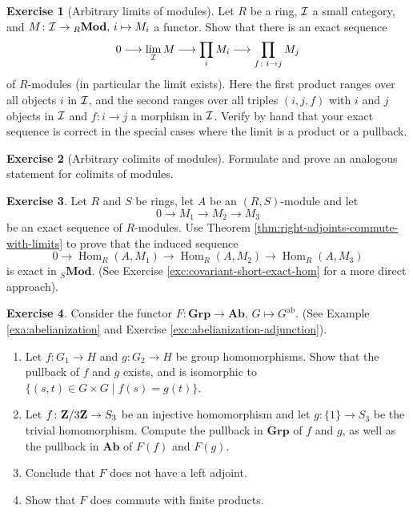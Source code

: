 \documentclass[11pt]{amsbook}
\newcommand{\longto}{\longrightarrow}
\DeclareMathOperator\Hom{Hom}
\DeclareMathOperator\Mod{{\bf{Mod}}}
\def\ab{\mathrm{ab}}
\def\Ab{\mathbf{Ab}}
\def\Grp{\mathbf{Grp}}
\def\Mod{\mathbf{Mod}}
\theoremstyle{plain}
\theoremstyle{definition}
\newtheorem{exercise}{Exercise}
\begin{document}
\begin{exercise}[Arbitrary limits of modules]
Let $R$ be a ring, ${\mathcal{I}}$ a small category, and $M\colon \cI \to {}_R\Mod,\, i \mapsto M_i$ a functor. Show that there is an exact sequence
\[
	0 \longto \lim_\cI M \longto \prod_{i} M_i \longto \prod_{f\colon i\to j} M_j
\]
of $R$-modules (in particular the limit exists). Here the first product ranges over all objects $i$ in ${\mathcal{I}}$, and the second ranges over all triples $(i,j,f)$ with $i$ and $j$ objects in ${\mathcal{I}}$ and $f\colon i\to j$ a morphism in ${\mathcal{I}}$. Verify by hand that your exact sequence is correct in the special cases where the limit is a product or a pullback.
\end{exercise}

\begin{exercise}[Arbitrary colimits of modules]
Formulate and prove an analogous statement for colimits of modules.
\end{exercise}

\begin{exercise}
Let $R$ and $S$ be rings, let $A$ be an $(R,S)$-module and let 
\[
	0 \longto M_1 \longto M_2 \longto M_3
\]
be an exact sequence of $R$-modules. Use Theorem \ref{thm:right-adjoints-commute-with-limits} to prove that
the induced sequence
\[
	0 \longto \Hom_R(A,M_1) \longto \Hom_R(A,M_2) \longto \Hom_R(A,M_3)
\]
is exact in ${}_S\Mod$. (See Exercise \ref{exc:covariant-short-exact-hom} for a more direct approach). 
\end{exercise}

\begin{exercise}Consider the functor $F\colon \Grp \to \Ab,\, G\mapsto G^\ab$. (See Example \ref{exa:abelianization} and Exercise \ref{exc:abelianization-adjunction}).
\begin{enumerate}
\item Let $f\colon G_1\to H$ and $g\colon G_2\to H$ be group homomorphisms. Show that the pullback of $f$ and $g$ exists, and is isomorphic to
$\{ (s,t)\in G\times G \mid f(s)=g(t) \}$.
\item Let $f\colon {\mathbf{Z}}/3{\mathbf{Z}} \to S_3$ be an injective homomorphism and let $g\colon \{1\}\to S_3$ be the trivial homomorphism. Compute the pullback in $\Grp$ of $f$ and $g$, as well as the pullback in $\Ab$ of $F(f)$ and $F(g)$.
\item Conclude that $F$ does not have a left adjoint.
\item Show that $F$ does commute with finite products. 
\end{enumerate}
\end{exercise}
\end{document}
